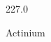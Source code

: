 \documentclass[12pt]{article}
\begin{document}
\hfill{}
\vfill
\begin{center}
  {\fontsize{50}{60}
  }

  \vspace{1em}

  227.0

Actinium
\end{center}
\vfill
\end{document}
